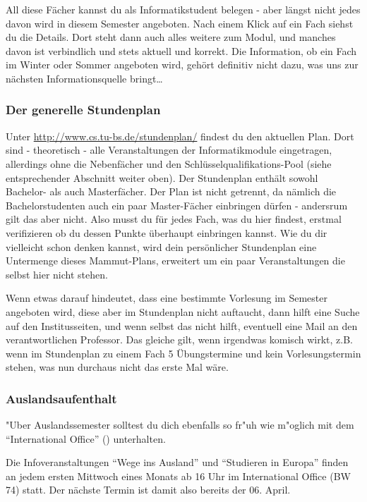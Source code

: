 All diese Fächer kannst du als Informatikstudent belegen - aber längst nicht jedes davon wird in diesem Semester angeboten. Nach einem Klick auf ein Fach siehst du die Details. Dort steht dann auch alles weitere zum Modul, und manches davon ist verbindlich und stets aktuell und korrekt. Die Information, ob ein Fach im Winter oder Sommer angeboten wird, gehört definitiv nicht dazu, was uns zur nächsten Informationsquelle bringt\ldots

\subsubsection{Der generelle Stundenplan}
Unter \url{http://www.cs.tu-bs.de/stundenplan/}
findest du den aktuellen Plan.%
Dort sind -
theoretisch - alle Veranstaltungen der Informatikmodule eingetragen,
allerdings ohne die Nebenfächer und den Schlüsselqualifikations-Pool (siehe entsprechender Abschnitt weiter oben). Der Stundenplan enthält sowohl Bachelor- als auch Masterfächer. Der Plan ist nicht getrennt, da nämlich die Bachelorstudenten auch ein paar Master-Fächer einbringen dürfen - andersrum gilt das aber nicht. Also musst du für jedes Fach, was du hier findest, erstmal verifizieren ob du dessen Punkte überhaupt  einbringen kannst. Wie du dir vielleicht schon denken kannst, wird dein persönlicher Stundenplan eine Untermenge dieses Mammut-Plans, erweitert um ein paar Veranstaltungen die selbst hier nicht stehen.

Wenn etwas darauf hindeutet, dass eine bestimmte Vorlesung im Semester angeboten wird, diese aber im Stundenplan nicht auftaucht, dann hilft eine Suche auf den Institusseiten, und wenn selbst das nicht hilft, eventuell eine Mail an den verantwortlichen Professor. Das gleiche gilt, wenn irgendwas komisch wirkt, z.B. wenn im Stundenplan zu einem Fach 5 Übungstermine und kein Vorlesungstermin stehen, was nun durchaus nicht das erste Mal wäre.

\subsubsection{Auslandsaufenthalt}
"Uber Auslandssemester solltest du dich ebenfalls so fr"uh wie m"oglich mit dem "`International Office"' () unterhalten.

Die Infoveranstaltungen "`Wege ins Ausland"' und "`Studieren in Europa"' finden an jedem ersten Mittwoch eines Monats ab 16 Uhr im International Office (BW 74) statt. Der nächste Termin ist damit also bereits der 06. April.

